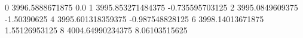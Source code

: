 0 3996.5888671875 0.0
1 3995.853271484375 -0.735595703125
2 3995.0849609375 -1.50390625
4 3995.601318359375 -0.987548828125
6 3998.14013671875 1.55126953125
8 4004.64990234375 8.06103515625
